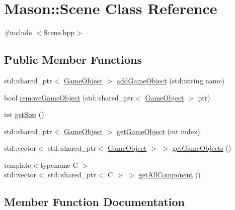 \hypertarget{class_mason_1_1_scene}{}\section{Mason\+:\+:Scene Class Reference}
\label{class_mason_1_1_scene}


{\ttfamily \#include $<$Scene.\+hpp$>$}

\subsection*{Public Member Functions}
\begin{DoxyCompactItemize}
\item 
std\+::shared\+\_\+ptr$<$ \hyperlink{class_mason_1_1_game_object}{Game\+Object} $>$ \hyperlink{class_mason_1_1_scene_afe8ac9cb371c04a0587faf06bf828ac9}{add\+Game\+Object} (std\+::string name)
\item 
bool \hyperlink{class_mason_1_1_scene_aad5427fcdd330f65dc4e7b1e627afce4}{remove\+Game\+Object} (std\+::shared\+\_\+ptr$<$ \hyperlink{class_mason_1_1_game_object}{Game\+Object} $>$ ptr)
\item 
int \hyperlink{class_mason_1_1_scene_a97780dbb825e92c62b02623fe1e297fa}{get\+Size} ()
\item 
std\+::shared\+\_\+ptr$<$ \hyperlink{class_mason_1_1_game_object}{Game\+Object} $>$ \hyperlink{class_mason_1_1_scene_ae13738888d4f00135fb827639f87239b}{get\+Game\+Object} (int index)
\item 
std\+::vector$<$ std\+::shared\+\_\+ptr$<$ \hyperlink{class_mason_1_1_game_object}{Game\+Object} $>$ $>$ \hyperlink{class_mason_1_1_scene_a045d786fa6f11ab01e190971637b15ce}{get\+Game\+Objects} ()
\item 
{\footnotesize template$<$typename C $>$ }\\std\+::vector$<$ std\+::shared\+\_\+ptr$<$ C $>$ $>$ \hyperlink{class_mason_1_1_scene_a0766a39a27d936b12a93cb3f49ee32b0}{get\+All\+Component} ()
\end{DoxyCompactItemize}


\subsection{Member Function Documentation}
\hypertarget{class_mason_1_1_scene_afe8ac9cb371c04a0587faf06bf828ac9}{}\label{class_mason_1_1_scene_afe8ac9cb371c04a0587faf06bf828ac9} 
